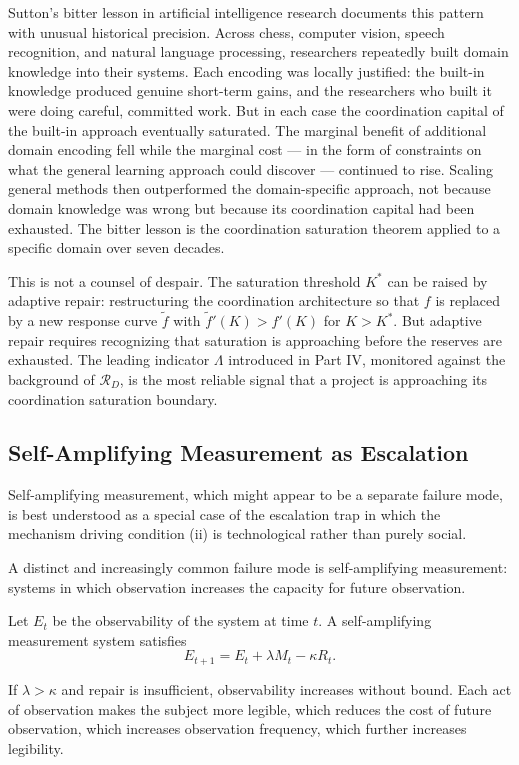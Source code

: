 \documentclass[12pt, a4paper]{article}
\theoremstyle{flyxion}
\begin{document}
Sutton's bitter lesson in artificial intelligence research \cite{sutton2019} documents this pattern with unusual historical precision. Across chess, computer vision, speech recognition, and natural language processing, researchers repeatedly built domain knowledge into their systems. Each encoding was locally justified: the built-in knowledge produced genuine short-term gains, and the researchers who built it were doing careful, committed work. But in each case the coordination capital of the built-in approach eventually saturated. The marginal benefit of additional domain encoding fell while the marginal cost --- in the form of constraints on what the general learning approach could discover --- continued to rise. Scaling general methods then outperformed the domain-specific approach, not because domain knowledge was wrong but because its coordination capital had been exhausted. The bitter lesson is the coordination saturation theorem applied to a specific domain over seven decades.

This is not a counsel of despair. The saturation threshold $K^*$ can be raised by adaptive repair: restructuring the coordination architecture so that $f$ is replaced by a new response curve $\tilde{f}$ with $\tilde{f}'(K) > f'(K)$ for $K > K^*$. But adaptive repair requires recognizing that saturation is approaching before the reserves are exhausted. The leading indicator $\Lambda$ introduced in Part IV, monitored against the background of $\mathcal{R}_D$, is the most reliable signal that a project is approaching its coordination saturation boundary.

\subsection*{Self-Amplifying Measurement as Escalation}

Self-amplifying measurement, which might appear to be a separate failure mode, is best understood as a special case of the escalation trap in which the mechanism driving condition (ii) is technological rather than purely social.

A distinct and increasingly common failure mode is self-amplifying measurement: systems in which observation increases the capacity for future observation.

Let $E_t$ be the observability of the system at time $t$. A self-amplifying measurement system satisfies
\[
  E_{t+1} = E_t + \lambda M_t - \kappa R_t.
\]

If $\lambda > \kappa$ and repair is insufficient, observability increases without bound. Each act of observation makes the subject more legible, which reduces the cost of future observation, which increases observation frequency, which further increases legibility.
\end{document}
